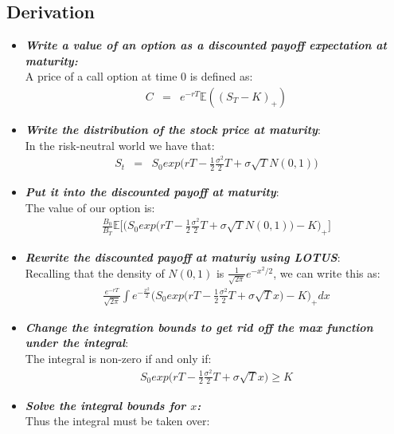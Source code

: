 \subsection{Derivation}
\begin{itemize}
	\item \textbf{\textit{Write a value of an option as a discounted payoff expectation at maturity:}}\\
A price of a call option at time $0$ is defined as:
\begin{eqnarray}
C &=& e^{-rT}\mathbb{E}((S_{T} - K)_{+})
\end{eqnarray}
	\item \textbf{\textit{Write the distribution of the stock price at maturity}}:\\
In the risk-neutral world we have that:
\begin{eqnarray}
S_{t} &=& S_{0}exp\bigg(rT - \frac{1}{2}\frac{\sigma ^{2}}{2}T + \sigma\sqrt{T}N(0, 1)\bigg)
\end{eqnarray}
	\item \textbf{\textit{Put it into the discounted payoff at maturity}}:\\
	The value of our option is:
	\begin{eqnarray}
	\frac{B_{0}}{B_{T}}\mathbb{E}\bigg[\bigg(S_{0}exp\bigg(rT - \frac{1}{2}\frac{\sigma ^{2}}{2}T + \sigma\sqrt{T}N(0, 1)\bigg) - K\bigg)_{+}\bigg]
	\end{eqnarray}
	\item \textbf{\textit{Rewrite the discounted payoff at maturiy using LOTUS}}:\\
	Recalling that the density of $N(0, 1)$ is $\frac{1}{\sqrt{2\pi}}e^{-x^{2}/2}$, we can write this as:
	\begin{eqnarray}
		\frac{e^{-rT}}{\sqrt{2\pi}}\int{e^{-\frac{x^{2}}{2}}\bigg(S_{0}exp\bigg(rT - \frac{1}{2}\frac{\sigma ^{2}}{2}T + \sigma\sqrt{T}x\bigg) - K\bigg)_{+}}dx
	\end{eqnarray}
	\item \textbf{\textit{Change the integration bounds to get rid off the max function under the integral}}:\\
	The integral is non-zero if and only if:
	\begin{eqnarray}
		S_{0}exp\bigg(rT - \frac{1}{2}\frac{\sigma ^{2}}{2}T + \sigma\sqrt{T}x\bigg) \geq K
	\end{eqnarray}
	\item \textbf{\textit{Solve the integral bounds for $x$:}}\\
	Thus the integral must be taken over:

\end{itemize}
